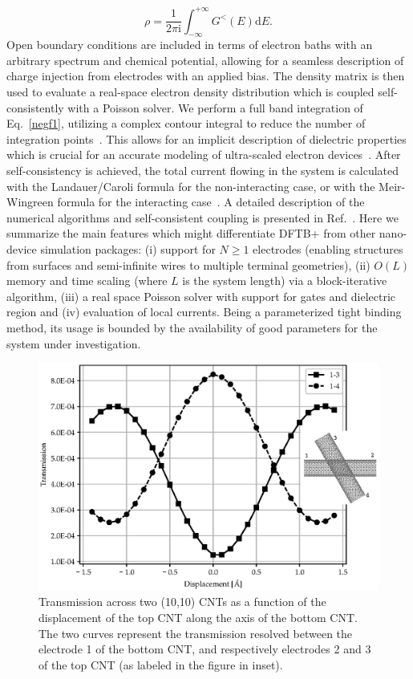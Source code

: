 \documentclass[reprint,onecolumn,superscriptaddress]{revtex4-1}
\newcommand{\dftbp}{DFTB+}
\begin{document}
\begin{equation} \label{negf1}
  \rho = \frac{1}{2\pi \mathrm{i}} \int_{-\infty}^{+\infty} {G^{<}(E)
    \mathrm{d}E}.
\end{equation}
%
Open boundary conditions are included in terms of electron baths with an
arbitrary spectrum and chemical potential, allowing for a seamless description
of charge injection from electrodes with an applied bias. The density matrix is
then used to evaluate a real-space electron density distribution which is
coupled self-consistently with a Poisson solver.  We perform a full band
integration of Eq.~\ref{negf1}, utilizing a complex contour integral to reduce
the number of integration points~\cite{pecchia2004}. This allows for an implicit
description of dielectric properties which is crucial for an accurate modeling
of ultra-scaled electron devices~\cite{markov2015,chu2018}. After
self-consistency is achieved, the total current flowing in the system is
calculated with the Landauer/Caroli formula for the non-interacting case, or
with the Meir-Wingreen formula for the interacting case~\cite{haug2008}. A
detailed description of the numerical algorithms and self-consistent coupling is
presented in Ref.~\cite{pecchia2008}. Here we summarize the main features
which might differentiate \dftbp{} from other nano-device simulation packages:
(i) support for $N \geqslant 1$ electrodes (enabling structures from surfaces
and semi-infinite wires to multiple terminal geometries), (ii) $O(L)$
memory and time scaling (where $L$ is the system length) via a block-iterative
algorithm, (iii) a real space Poisson solver with support for gates and
dielectric region and (iv) evaluation of local currents.  Being a parameterized
tight binding method, its usage is bounded by the availability of good
parameters for the system under investigation.

\begin{figure}[htbp]
  \centering
  \includegraphics[scale=.75]{figures/dftb-negf1.eps}
  \caption{\label{fig:dftb_negf1} Transmission across two (10,10) CNTs as a
    function of the displacement of the top CNT along the axis of the bottom
    CNT. The two curves represent the transmission resolved between the
    electrode 1 of the bottom CNT, and respectively electrodes 2 and 3 of the
    top CNT (as labeled in the figure in inset).}
\end{figure}
\end{document}
